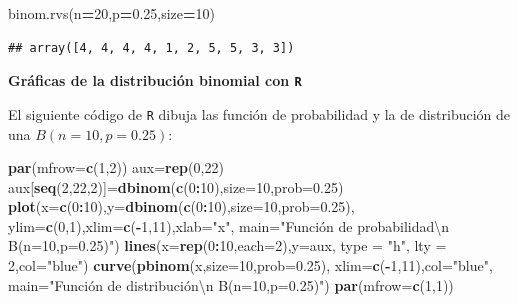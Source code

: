 \documentclass[]{book}
\newenvironment{Shaded}{\begin{snugshade}}{\end{snugshade}}
\newcommand{\CharTok}[1]{\textcolor[rgb]{0.31,0.60,0.02}{#1}}
\newcommand{\DataTypeTok}[1]{\textcolor[rgb]{0.13,0.29,0.53}{#1}}
\newcommand{\DecValTok}[1]{\textcolor[rgb]{0.00,0.00,0.81}{#1}}
\newcommand{\FloatTok}[1]{\textcolor[rgb]{0.00,0.00,0.81}{#1}}
\newcommand{\KeywordTok}[1]{\textcolor[rgb]{0.13,0.29,0.53}{\textbf{#1}}}
\newcommand{\NormalTok}[1]{#1}
\newcommand{\OperatorTok}[1]{\textcolor[rgb]{0.81,0.36,0.00}{\textbf{#1}}}
\newcommand{\StringTok}[1]{\textcolor[rgb]{0.31,0.60,0.02}{#1}}
\begin{document}
\begin{Shaded}
\begin{Highlighting}[]
\NormalTok{binom.rvs(n}\OperatorTok{=}\DecValTok{20}\NormalTok{,p}\OperatorTok{=}\FloatTok{0.25}\NormalTok{,size}\OperatorTok{=}\DecValTok{10}\NormalTok{)}
\end{Highlighting}
\end{Shaded}

\begin{verbatim}
## array([4, 4, 4, 4, 1, 2, 5, 5, 3, 3])
\end{verbatim}

\textbf{Gráficas de la distribución binomial con \texttt{R}}

El siguiente código de \texttt{R} dibuja las función de probabilidad y la de distribución de una \(B(n=10,p=0.25)\):

\begin{Shaded}
\begin{Highlighting}[]
\KeywordTok{par}\NormalTok{(}\DataTypeTok{mfrow=}\KeywordTok{c}\NormalTok{(}\DecValTok{1}\NormalTok{,}\DecValTok{2}\NormalTok{))}
\NormalTok{aux=}\KeywordTok{rep}\NormalTok{(}\DecValTok{0}\NormalTok{,}\DecValTok{22}\NormalTok{)}
\NormalTok{aux[}\KeywordTok{seq}\NormalTok{(}\DecValTok{2}\NormalTok{,}\DecValTok{22}\NormalTok{,}\DecValTok{2}\NormalTok{)]=}\KeywordTok{dbinom}\NormalTok{(}\KeywordTok{c}\NormalTok{(}\DecValTok{0}\OperatorTok{:}\DecValTok{10}\NormalTok{),}\DataTypeTok{size=}\DecValTok{10}\NormalTok{,}\DataTypeTok{prob=}\FloatTok{0.25}\NormalTok{)}
\KeywordTok{plot}\NormalTok{(}\DataTypeTok{x=}\KeywordTok{c}\NormalTok{(}\DecValTok{0}\OperatorTok{:}\DecValTok{10}\NormalTok{),}\DataTypeTok{y=}\KeywordTok{dbinom}\NormalTok{(}\KeywordTok{c}\NormalTok{(}\DecValTok{0}\OperatorTok{:}\DecValTok{10}\NormalTok{),}\DataTypeTok{size=}\DecValTok{10}\NormalTok{,}\DataTypeTok{prob=}\FloatTok{0.25}\NormalTok{),}
  \DataTypeTok{ylim=}\KeywordTok{c}\NormalTok{(}\DecValTok{0}\NormalTok{,}\DecValTok{1}\NormalTok{),}\DataTypeTok{xlim=}\KeywordTok{c}\NormalTok{(}\OperatorTok{-}\DecValTok{1}\NormalTok{,}\DecValTok{11}\NormalTok{),}\DataTypeTok{xlab=}\StringTok{"x"}\NormalTok{,}
  \DataTypeTok{main=}\StringTok{"Función de probabilidad}\CharTok{\textbackslash{}n}\StringTok{ B(n=10,p=0.25)"}\NormalTok{)}
\KeywordTok{lines}\NormalTok{(}\DataTypeTok{x=}\KeywordTok{rep}\NormalTok{(}\DecValTok{0}\OperatorTok{:}\DecValTok{10}\NormalTok{,}\DataTypeTok{each=}\DecValTok{2}\NormalTok{),}\DataTypeTok{y=}\NormalTok{aux, }\DataTypeTok{type =} \StringTok{"h"}\NormalTok{, }\DataTypeTok{lty =} \DecValTok{2}\NormalTok{,}\DataTypeTok{col=}\StringTok{"blue"}\NormalTok{)}
\KeywordTok{curve}\NormalTok{(}\KeywordTok{pbinom}\NormalTok{(x,}\DataTypeTok{size=}\DecValTok{10}\NormalTok{,}\DataTypeTok{prob=}\FloatTok{0.25}\NormalTok{),}
  \DataTypeTok{xlim=}\KeywordTok{c}\NormalTok{(}\OperatorTok{-}\DecValTok{1}\NormalTok{,}\DecValTok{11}\NormalTok{),}\DataTypeTok{col=}\StringTok{"blue"}\NormalTok{,}
  \DataTypeTok{main=}\StringTok{"Función de distribución\textbackslash{}n B(n=10,p=0.25)"}\NormalTok{)}
\KeywordTok{par}\NormalTok{(}\DataTypeTok{mfrow=}\KeywordTok{c}\NormalTok{(}\DecValTok{1}\NormalTok{,}\DecValTok{1}\NormalTok{))}
\end{Highlighting}
\end{Shaded}
\end{document}
